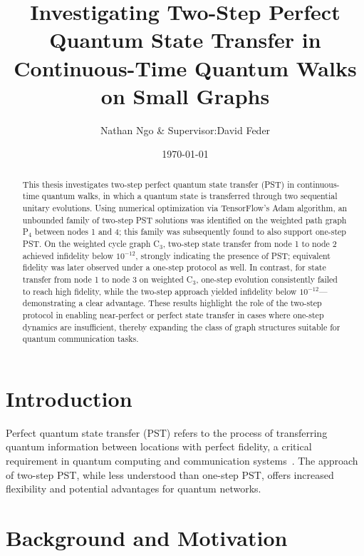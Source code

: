 \documentclass[reprint, aps, 12pt, floatfix]{revtex4-2}
\begin{document}
\title{Investigating Two-Step Perfect Quantum State Transfer in Continuous-Time Quantum Walks on Small Graphs}
\author{Nathan Ngo \& Supervisor:\;David Feder}
\date{\today}

\begin{abstract}
\singlespacing
This thesis investigates two-step perfect quantum state transfer (PST) in continuous-time quantum walks, in which a quantum state is transferred through two sequential unitary evolutions. Using numerical optimization via TensorFlow’s Adam algorithm, an unbounded family of two-step PST solutions was identified on the weighted path graph P$_4$ between nodes 1 and 4; this family was subsequently found to also support one-step PST. On the weighted cycle graph C$_3$, two-step state transfer from node 1 to node 2 achieved infidelity below $10^{-12}$, strongly indicating the presence of PST; equivalent fidelity was later observed under a one-step protocol as well. In contrast, for state transfer from node 1 to node 3 on weighted C$_3$, one-step evolution consistently failed to reach high fidelity, while the two-step approach yielded infidelity below $10^{-12}$—demonstrating a clear advantage. These results highlight the role of the two-step protocol in enabling near-perfect or perfect state transfer in cases where one-step dynamics are insufficient, thereby expanding the class of graph structures suitable for quantum communication tasks.
\end{abstract}


\maketitle
\singlespacing

\section{Introduction}
Perfect quantum state transfer (PST) refers to the process of transferring quantum information between locations with perfect fidelity, a critical requirement in quantum computing and communication systems~\cite{BoseSougato2003Qcta}. The approach of two-step PST, while less understood than one-step PST, offers increased flexibility and potential advantages for quantum networks.

\section{Background and Motivation}
\end{document}
